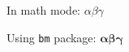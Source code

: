 \documentclass{article}
\begin{document}
In math mode: $\alpha \beta \gamma$

Using \texttt{bm} package: \(\bm{\alpha \beta \gamma}\)
\end{document}
